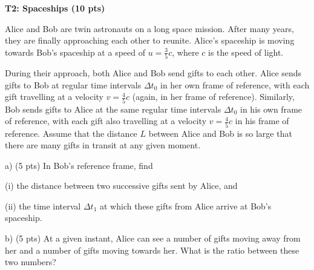 \textbf{T2: Spaceships (10 pts)}

Alice and Bob are twin astronauts on a long space mission. After many years,
they are finally approaching each other to reunite. Alice's spaceship is moving
towards Bob's spaceship at a speed of $u = \tfrac{3}{5}c$, where $c$ is the
speed of light.

During their approach, both Alice and Bob send gifts to each other. Alice sends
gifts to Bob at regular time intervals $\Delta t_0$ in her own frame of
reference, with each gift travelling at a velocity $v = \tfrac{4}{5}c$ (again,
in her frame of reference). Similarly, Bob sends gifts to Alice at the same
regular time intervals $\Delta t_0$ in his own frame of reference, with each
gift also travelling at a velocity $v = \tfrac{4}{5}c$ in his frame of
reference. Assume that the distance $L$ between Alice and Bob is so large that
there are many gifts in transit at any given moment.

a) (5 pts) In Bob's reference frame, find

(i) the distance between two successive gifts sent by Alice, and

(ii) the time interval $\Delta t_1$ at which these gifts from Alice arrive at
Bob's spaceship.

b) (5 pts) At a given instant, Alice can see a number of gifts moving away from
her and a number of gifts moving towards her. What is the ratio between these
two numbers?
